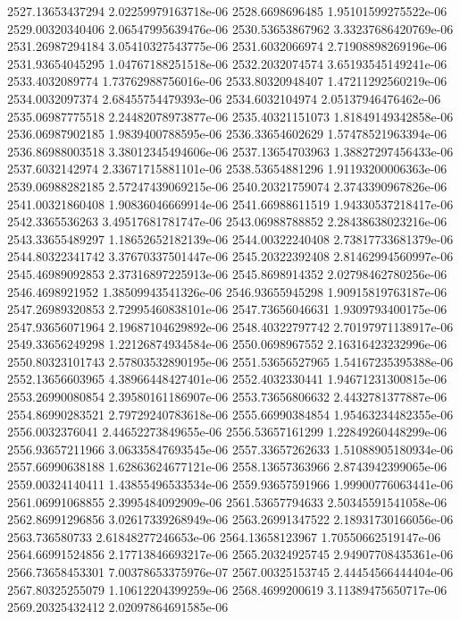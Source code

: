 {2527.13653437294 2.02259979163718e-06
2528.6698696485 1.95101599275522e-06
2529.00320340406 2.06547995639476e-06
2530.53653867962 3.33237686420769e-06
2531.26987294184 3.05410327543775e-06
2531.6032066974 2.71908898269196e-06
2531.93654045295 1.04767188251518e-06
2532.2032074574 3.65193545149241e-06
2533.4032089774 1.73762988756016e-06
2533.80320948407 1.47211292560219e-06
2534.0032097374 2.68455754479393e-06
2534.6032104974 2.05137946476462e-06
2535.06987775518 2.24482078973877e-06
2535.40321151073 1.81849149342858e-06
2536.06987902185 1.9839400788595e-06
2536.33654602629 1.57478521963394e-06
2536.86988003518 3.38012345494606e-06
2537.13654703963 1.38827297456433e-06
2537.6032142974 2.33671715881101e-06
2538.53654881296 1.91193200006363e-06
2539.06988282185 2.57247439069215e-06
2540.20321759074 2.3743390967826e-06
2541.00321860408 1.90836046669914e-06
2541.66988611519 1.94330537218417e-06
2542.3365536263 3.49517681781747e-06
2543.06988788852 2.28438638023216e-06
2543.33655489297 1.18652652182139e-06
2544.00322240408 2.73817733681379e-06
2544.80322341742 3.37670337501447e-06
2545.20322392408 2.81462994560997e-06
2545.46989092853 2.37316897225913e-06
2545.8698914352 2.02798462780256e-06
2546.4698921952 1.38509943541326e-06
2546.93655945298 1.90915819763187e-06
2547.26989320853 2.72995460838101e-06
2547.73656046631 1.9309793400175e-06
2547.93656071964 2.19687104629892e-06
2548.40322797742 2.70197971138917e-06
2549.33656249298 1.22126874934584e-06
2550.0698967552 2.16316423232996e-06
2550.80323101743 2.57803532890195e-06
2551.53656527965 1.54167235395388e-06
2552.13656603965 4.38966448427401e-06
2552.4032330441 1.94671231300815e-06
2553.26990080854 2.39580161186907e-06
2553.73656806632 2.4432781377887e-06
2554.86990283521 2.79729240783618e-06
2555.66990384854 1.95463234482355e-06
2556.0032376041 2.44652273849655e-06
2556.53657161299 1.22849260448299e-06
2556.93657211966 3.06335847693545e-06
2557.33657262633 1.51088905180934e-06
2557.66990638188 1.62863624677121e-06
2558.13657363966 2.8743942399065e-06
2559.00324140411 1.43855496533534e-06
2559.93657591966 1.99900776063441e-06
2561.06991068855 2.3995484092909e-06
2561.53657794633 2.50345591541058e-06
2562.86991296856 3.02617339268949e-06
2563.26991347522 2.18931730166056e-06
2563.736580733 2.61848277246653e-06
2564.13658123967 1.70550662519147e-06
2564.66991524856 2.17713846693217e-06
2565.20324925745 2.94907708435361e-06
2566.73658453301 7.00378653375976e-07
2567.00325153745 2.44454566444404e-06
2567.80325255079 1.10612204399259e-06
2568.4699200619 3.11389475650717e-06
2569.20325432412 2.02097864691585e-06
}
